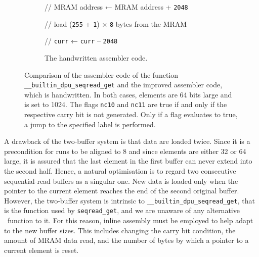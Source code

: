 \begin{figure}[t]
\begin{subfigure}{\textwidth}
\begin{minipage}{ \widthof{// \lstinline|curr| ← \lstinline|curr| + \lstinline|8|; jump if no 10th carry bit} }
			// \ac{MRAM} address ← \ac{MRAM} address + \lstinline|2048|

			// load (\lstinline|255| + \lstinline|1|) × \lstinline|8| bytes from the \ac{MRAM}

			// \lstinline|curr| ← \lstinline|curr| – \lstinline|2048|

			\phantom{lg}
		\end{minipage}

		\caption{
			The handwritten assembler code.
		}
		\label{fig:merge:assembler:manual}
	\end{subfigure}

	\caption{
		Comparison of the assembler code of the function \lstinline|__builtin_dpu_seqread_get| and the improved assembler code, which is handwritten.
		In both cases, elements are 64 bits large and \seqreadcachesize{} is set to 1024.
		The flags \lstinline|nc10| and \lstinline|nc11| are true if and only if the respective carry bit is not generated.
		Only if a flag evaluates to true, a jump to the specified label is performed.
	}
	\label{fig:merge:assembler}
\end{figure}

A drawback of the two-buffer system is that data are loaded twice.
Since it is a precondition for runs to be aligned to \qty{8}{\byte} and since elements are either \qty{32}{\bits} or \qty{64}{\bits} large, it is assured that the last element in the first buffer can never extend into the second half.
Hence, a natural optimisation is to regard two consecutive sequential-read buffers as a singular one.
New data is loaded only when the pointer to the current element reaches the end of the second original buffer.
However, the two-buffer system is intrinsic to \lstinline|__builtin_dpu_seqread_get|, that is the function used by \lstinline|seqread_get|, and we are unaware of any alternative \langC{}~function to it.
For this reason, inline assembly must be employed to help adapt to the new buffer sizes.
This includes changing the carry bit condition, the amount of \ac{MRAM} data read, and the number of bytes by which a pointer to a current element is reset.

